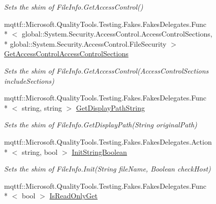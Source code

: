 \begin{DoxyCompactItemize}
\begin{DoxyCompactList}\small\item\em Sets the shim of File\-Info.\-Get\-Access\-Control()\end{DoxyCompactList}\item 
mqttf\-::\-Microsoft.\-Quality\-Tools.\-Testing.\-Fakes.\-Fakes\-Delegates.\-Func\\*
$<$ global\-::\-System.\-Security.\-Access\-Control.\-Access\-Control\-Sections, \\*
global\-::\-System.\-Security.\-Access\-Control.\-File\-Security $>$ \hyperlink{class_system_1_1_i_o_1_1_fakes_1_1_shim_file_info_a3c30a12b9f6b8aec2b14e8d13844f43f}{Get\-Access\-Control\-Access\-Control\-Sections}
\begin{DoxyCompactList}\small\item\em Sets the shim of File\-Info.\-Get\-Access\-Control(\-Access\-Control\-Sections include\-Sections)\end{DoxyCompactList}\item 
mqttf\-::\-Microsoft.\-Quality\-Tools.\-Testing.\-Fakes.\-Fakes\-Delegates.\-Func\\*
$<$ string, string $>$ \hyperlink{class_system_1_1_i_o_1_1_fakes_1_1_shim_file_info_ae0506f07a51f9c73a48cd41d6c3f7052}{Get\-Display\-Path\-String}
\begin{DoxyCompactList}\small\item\em Sets the shim of File\-Info.\-Get\-Display\-Path(\-String original\-Path)\end{DoxyCompactList}\item 
mqttf\-::\-Microsoft.\-Quality\-Tools.\-Testing.\-Fakes.\-Fakes\-Delegates.\-Action\\*
$<$ string, bool $>$ \hyperlink{class_system_1_1_i_o_1_1_fakes_1_1_shim_file_info_ae7037746106a352f36e9cb30b16d610e}{Init\-String\-Boolean}
\begin{DoxyCompactList}\small\item\em Sets the shim of File\-Info.\-Init(\-String file\-Name, Boolean check\-Host)\end{DoxyCompactList}\item 
mqttf\-::\-Microsoft.\-Quality\-Tools.\-Testing.\-Fakes.\-Fakes\-Delegates.\-Func\\*
$<$ bool $>$ \hyperlink{class_system_1_1_i_o_1_1_fakes_1_1_shim_file_info_a2032dd9b8ddb913a0ccc474fab7427e0}{Is\-Read\-Only\-Get}

\end{DoxyCompactItemize}
